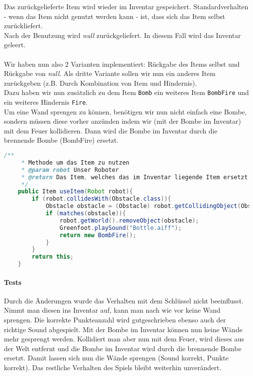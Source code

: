 \documentclass{pi1}
\begin{document}
Das zurückgelieferte Item wird wieder im Inventar gespeichert. Standardverhalten - wenn das Item nicht genutzt werden kann - ist, dass sich das Item selbst zurückliefert.\\
Nach der Benutzung wird \emph{null} zurückgeliefert. In diesem Fall wird das Inventar geleert.\\
\\
Wir haben nun also 2 Varianten implementiert: Rückgabe des Items selbst und Rückgabe von \emph{null}. Als dritte Variante sollen wir nun ein anderes Item zurückgeben (z.B. Durch Kombination von Item und Hindernis).\\
Dazu haben wir nun zusätzlich zu dem Item  \texttt{Bomb} ein weiteres Item \texttt{BombFire} und ein weiteres Hindernis \texttt{Fire}.\\
Um eine Wand sprengen zu können, benötigen wir nun nicht einfach eine Bombe, sondern müssen diese vorher anzünden indem wir (mit der Bombe im Inventar) mit dem Feuer kollidieren. Dann wird die Bombe im Inventar durch die brennende Bombe (BombFire) ersetzt.

\begin{lstlisting}[caption={Klasse \emph{Bomb}, Methode \emph{useItem()}},firstnumber=11, language=Java]
/**
     * Methode um das Item zu nutzen
     * @param robot Unser Roboter
     * @return Das Item, welches das im Inventar liegende Item ersetzt
     */
    public Item useItem(Robot robot){
        if (robot.collidesWith(Obstacle.class)){
            Obstacle obstacle = (Obstacle) robot.getCollidingObject(Obstacle.class);
            if (matches(obstacle)){
                robot.getWorld().removeObject(obstacle);
                Greenfoot.playSound("Bottle.aiff");
                return new BombFire();
            }
        }
        return this;
    }
\end{lstlisting}

\paragraph{Tests} Durch die Änderungen wurde das Verhalten mit dem Schlüssel nicht beeinflusst. Nimmt man diesen ins Inventar auf, kann man nach wie vor keine Wand sprengen. Die korrekte Punkteanzahl wird gutgeschrieben ebenso auch der richtige Sound abgespielt. Mit der Bombe im Inventar können nun keine Wände mehr gesprengt werden. Kollidiert man aber nun mit dem Feuer, wird dieses aus der Welt entfernt und die Bombe im Inventar wird durch die brennende Bombe ersetzt. Damit lassen sich nun die Wände sprengen (Sound korrekt, Punkte korrekt). Das restliche Verhalten des Spiels bleibt weiterhin unverändert.
\end{document}
